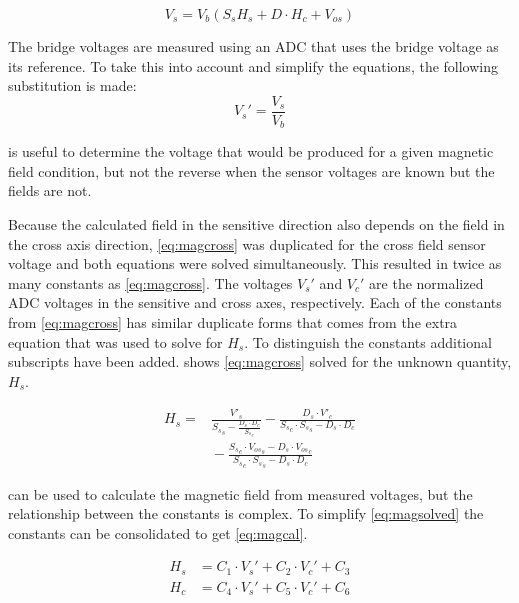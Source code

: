 \begin{equation}
    V_s = V_b \left(S_s H_s + D \cdot H_c + V_{os} \right)
    \label{eq:magcross}
\end{equation}
 
The bridge voltages are measured using an \ac{ADC} that uses the bridge voltage as its reference. To take this into account and simplify the equations, the following substitution is made:
\begin{equation}
    V_s'=\frac{V_s}{V_b}
    \label{eq:adcsub}
\end{equation}

 is useful to determine the voltage that would be produced for a given magnetic field condition, but not the reverse when the sensor voltages are known but the fields are not.

Because the calculated field in the sensitive direction also depends on the field in the cross axis direction, \cref{eq:magcross} was duplicated for the cross field sensor voltage and both equations were solved simultaneously. This resulted in twice as many constants as \cref{eq:magcross}. The voltages $V_s'$ and $V_c'$ are the normalized \ac{ADC} voltages in the sensitive and cross axes, respectively. Each of the constants from \cref{eq:magcross} has similar duplicate forms that comes from the extra equation that was used to solve for $H_s$. To distinguish the constants additional subscripts have been added.  shows \cref{eq:magcross} solved for the unknown quantity, $H_s$.

\begin{equation}
    \begin{split}
    H_s = & \frac{V'_s }{{S_s}_s - \frac{D_s \cdot D_c}{{S_s}_c}} - \frac{D_s \cdot  V'_c }{{S_s}_c \cdot {S_s}_s - D_s \cdot D_c}\\
    & {}- \frac{{S_s}_c \cdot {V_{os}}_s  -D_s \cdot {V_{os}}_c}{{S_s}_c \cdot {S_s}_s - D_s \cdot D_c}
    \end{split}
    \label{eq:magsolved} 
\end{equation}

 can be used to calculate the magnetic field from measured voltages, but the relationship between the constants is complex. To simplify \cref{eq:magsolved} the constants can be consolidated to get \cref{eq:magcal}.

\begin{equation}
    \label{eq:magcal}
    \begin{split}
        H_s &= C_1 \cdot V_s' + C_2 \cdot V_c' + C_3\\
        H_c &= C_4 \cdot V_s' + C_5 \cdot V_c' + C_6
    \end{split}
\end{equation}


